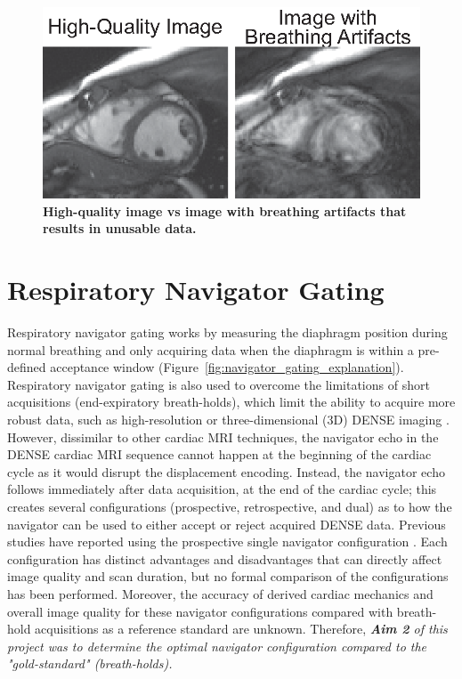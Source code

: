 	\begin{figure}
		\centering
		\includegraphics{figures/intro/good_bad_image_breathing_artifacts}
		\caption[High-quality image vs image with breathing artifacts that results in unusable data]{\textbf{High-quality image vs image with breathing artifacts that results in unusable data.}}
		\label{fig:good_bad_image_breathing_artifacts}
	\end{figure}

\section{Respiratory Navigator Gating}
	Respiratory navigator gating works by measuring the diaphragm position during normal breathing and only acquiring data when the diaphragm is within a pre-defined acceptance window (Figure~\ref{fig:navigator_gating_explanation}). Respiratory navigator gating is also used to overcome the limitations of short acquisitions (end-expiratory breath-holds), which limit the ability to acquire more robust data, such as high-resolution \cite{Wehner2014} or three-dimensional (3D) DENSE imaging \cite{Zhong2010a,Kar2014,Auger2012}. However, dissimilar to other cardiac MRI techniques, the navigator echo in the DENSE cardiac MRI sequence cannot happen at the beginning of the cardiac cycle as it would disrupt the displacement encoding. Instead, the navigator echo follows immediately after data acquisition, at the end of the cardiac cycle; this creates several configurations (prospective, retrospective, and dual) as to how the navigator can be used to either accept or reject acquired DENSE data. Previous studies have reported using the prospective single navigator configuration \cite{Zhong2010a,Auger2012}. Each configuration has distinct advantages and disadvantages that can directly affect image quality and scan duration, but no formal comparison of the configurations has been performed. Moreover, the accuracy of derived cardiac mechanics and overall image quality for these navigator configurations compared with breath-hold acquisitions as a reference standard are unknown. Therefore, \textit{\textbf{Aim 2} of this project was to determine the optimal navigator configuration compared to the "gold-standard" (breath-holds).}
	
